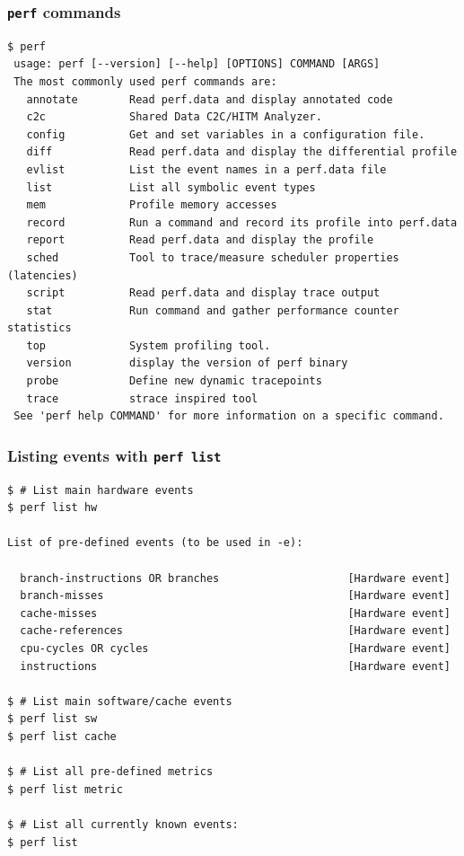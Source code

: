 \begin{frame}[fragile]
  \frametitle{\texttt{perf} commands}
  { \scriptsize
    \begin{block}{}
      \begin{verbatim}
$ perf
 usage: perf [--version] [--help] [OPTIONS] COMMAND [ARGS]
 The most commonly used perf commands are:
   annotate        Read perf.data and display annotated code
   c2c             Shared Data C2C/HITM Analyzer.
   config          Get and set variables in a configuration file.
   diff            Read perf.data and display the differential profile
   evlist          List the event names in a perf.data file
   list            List all symbolic event types
   mem             Profile memory accesses
   record          Run a command and record its profile into perf.data
   report          Read perf.data and display the profile
   sched           Tool to trace/measure scheduler properties (latencies)
   script          Read perf.data and display trace output
   stat            Run command and gather performance counter statistics
   top             System profiling tool.
   version         display the version of perf binary
   probe           Define new dynamic tracepoints
   trace           strace inspired tool
 See 'perf help COMMAND' for more information on a specific command.
      \end{verbatim}
    \end{block}
  }
\end{frame}

\begin{frame}[fragile]
  \frametitle{Listing events with \texttt{perf list}}
  { \scriptsize
    \begin{block}{}
      \begin{verbatim}
$ # List main hardware events
$ perf list hw

List of pre-defined events (to be used in -e):

  branch-instructions OR branches                    [Hardware event]
  branch-misses                                      [Hardware event]
  cache-misses                                       [Hardware event]
  cache-references                                   [Hardware event]
  cpu-cycles OR cycles                               [Hardware event]
  instructions                                       [Hardware event]

$ # List main software/cache events
$ perf list sw
$ perf list cache

$ # List all pre-defined metrics
$ perf list metric

$ # List all currently known events:
$ perf list
      \end{verbatim}
    \end{block}
  }
\end{frame}

